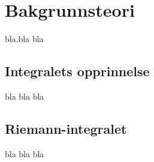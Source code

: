 
\section{Bakgrunnsteori}

bla.bla bla

\subsection{Integralets opprinnelse}

bla bla bla

\subsection{Riemann-integralet}

bla bla bla


